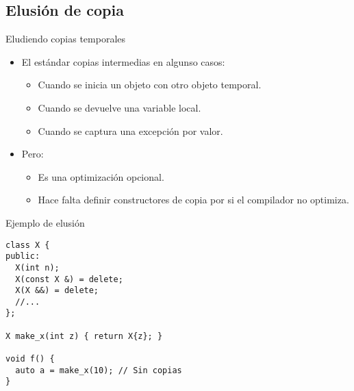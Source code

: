 \subsection{Elusión de copia}

\begin{frame}[t]{Eludiendo copias temporales}
\begin{itemize}
  \item El estándar  copias intermedias en algunso casos:
    \begin{itemize}
      \item Cuando se inicia un objeto con otro objeto temporal.
      \item Cuando se devuelve una variable local.
      \item Cuando se captura una excepción por valor.
    \end{itemize}
  \vfill\pause
  \item Pero:
    \begin{itemize}
      \item Es una optimización opcional.
      \item Hace falta definir constructores de copia por si el compilador no optimiza.
    \end{itemize}
\end{itemize}
\end{frame}

\begin{frame}[t,fragile]{Ejemplo de elusión}
\begin{lstlisting}
class X {
public:
  X(int n);
  X(const X &) = delete;
  X(X &&) = delete;
  //...
};

X make_x(int z) { return X{z}; }

void f() {
  auto a = make_x(10); // Sin copias
}
\end{lstlisting}
\end{frame}
